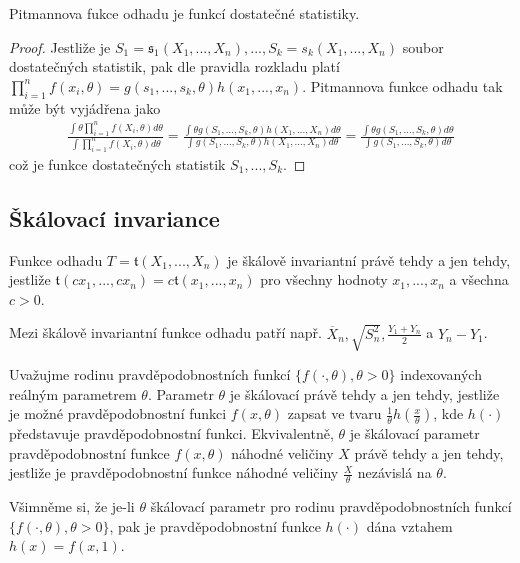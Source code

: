 \begin{theorem}
Pitmannova fukce odhadu je funkcí dostatečné statistiky.
\end{theorem}

\begin{proof}
Jestliže je $S_1 = \mathfrak{s}_1(X_1, ..., X_n), ..., S_k = \mathit{s_k}(X_1, ..., X_n)$ soubor dostatečných statistik, pak dle pravidla rozkladu platí $\prod_{i = 1}^n f(x_i, \theta) = g(s_1, ..., s_k, \theta)h(x_1, ..., x_n)$. Pitmannova funkce odhadu tak může být vyjádřena jako
\begin{gather*}
\frac{\int \theta \prod_{i = 1}^n f(X_i, \theta)d \theta}{\int \prod_{i = 1}^n f(X_i, \theta) d \theta} = \frac{\int \theta g(S_1, ..., S_k, \theta)h(X_1, ..., X_n)d \theta}{\int g(S_1, ..., S_k, \theta)h(X_1, ..., X_n)d \theta} = \frac{\int \theta g(S_1, ..., S_k, \theta)d \theta}{\int g(S_1, ..., S_k, \theta)d \theta}
\end{gather*}
což je funkce dostatečných statistik $S_1, ..., S_k$.
\end{proof}

\subsection{Škálovací invariance}

\begin{definition}
Funkce odhadu $T = \mathfrak{t}(X_1, ..., X_n)$ je škálově invariantní právě tehdy a jen tehdy, jestliže $\mathfrak{t}(cx_1, ..., cx_n) = c\mathfrak{t}(x_1, ..., x_n)$ pro všechny hodnoty $x_1, ..., x_n$ a všechna $c > 0$.
\end{definition}

\begin{example}
Mezi škálově invariantní funkce odhadu patří např. $\overline{X}_n, \sqrt{S_n^2}, \frac{Y_1 + Y_n}{2}$ a $Y_n - Y_1$.
\end{example}

\begin{definition}
Uvažujme rodinu pravděpodobnostních funkcí $\{f(\cdot, \theta), \theta > 0 \}$ indexovaných reálným parametrem $\theta$. Parametr $\theta$ je škálovací právě tehdy a jen tehdy, jestliže je možné pravděpodobnostní funkci $f(x, \theta)$ zapsat ve tvaru $\frac{1}{\theta}h\left(\frac{x}{\theta}\right)$, kde $h(\cdot)$ představuje pravděpodobnostní funkci. Ekvivalentně, $\theta$ je škálovací parametr pravděpodobnostní funkce $f(x, \theta)$ náhodné veličiny $X$ právě tehdy a jen tehdy, jestliže je pravděpodobnostní funkce náhodné veličiny $\frac{X}{\theta}$ nezávislá na $\theta$.

Všimněme si, že je-li $\theta$ škálovací parametr pro rodinu pravděpodobnostních funkcí $\{f(\cdot, \theta), \theta > 0\}$, pak je pravděpodobnostní funkce $h(\cdot)$ dána vztahem $h(x) = f(x, 1)$.
\end{definition}

